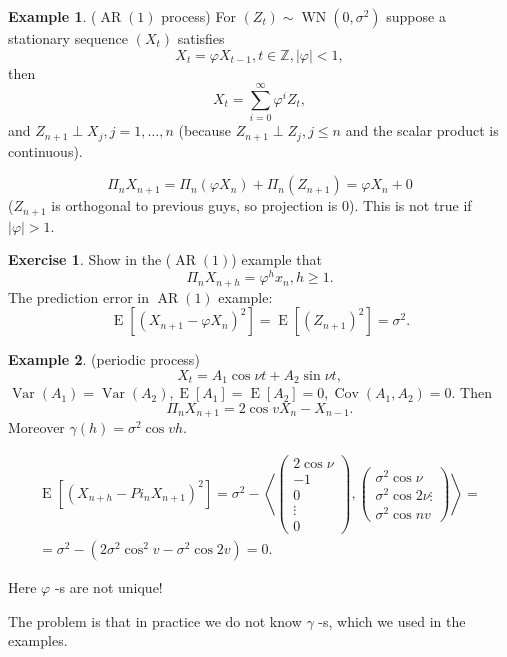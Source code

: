 \documentclass[12pt,a4paper, notitlepage]{book}
\theoremstyle{definition} %
\newtheorem{example}{Example}[chapter]
\newtheorem{exercise}{Exercise}[chapter]
\theoremstyle{plain} %
\newcommand{\Z}{\mathbb Z}
\DeclareMathOperator{\Var}{Var}
\DeclareMathOperator{\Cov}{Cov}
\DeclareMathOperator{\E}{E}
\DeclareMathOperator{\Wn}{WN}
\DeclareMathOperator{\Ar}{AR}
\begin{document}
\begin{example} ($\Ar(1)$ process)
For $(Z_t) \sim \Wn(0, \sigma^2)$ suppose a stationary sequence $(X_t)$ satisfies
\[ X_t = \varphi X_{t-1}, t\in \Z, |\varphi| < 1, \]  then
\[ X_t = \sum_{i = 0}^\infty \varphi^i Z_t , \]  and
$Z_{n+1} \perp X_j, j=1,\dots,n$ (because $Z_{n+1} \perp Z_j, j\leq n$ and the scalar product is continuous).

\[ \Pi_n X_{n+1} = \Pi_n(\varphi X_n) + \Pi_n(Z_{n+1}) = \varphi X_n + 0 \]
 ($Z_{n+1}$ is orthogonal to previous guys, so projection is $0$). This is not true if $|\varphi| > 1$.

\end{example}

\begin{exercise}
Show in the ($\Ar(1)$) example that 
\[ \Pi_n X_{n+h} = \varphi^h x_n, h \geq 1. \]
 The prediction error in $\Ar(1)$ example:
\[ \E \left[ (X_{n+1} - \varphi X_n)^2 \right] = \E \left[ (Z_{n+1})^2 \right] = \sigma ^2 . \]
\end{exercise}

\begin{example} (periodic process)
\[ X_t = A_1 \cos{\nu t} + A_2 \sin{\nu t}, \] 
 $  \Var( A_1) = \Var (A_2) , \E[A_1] =  \E[A_2] = 0, \Cov(A_1, A_2) = 0$.
Then 
\[ \Pi_n X_{n+1} = 2 \cos{v} X_n - X_{n-1} . \]
 Moreover 
$ \gamma(h)  = \sigma^2 \cos{vh}$.  

\begin{align*}
 \E\left[(X_{n+h} - Pi_nX_{n+1})^2\right] = \sigma^2 - \left<\left( \begin{array}{c} 2 \cos{\nu} \\ -1 \\ 0 \\ \vdots \\ 0 \end{array} \right), \left( \begin{array} {c} \sigma^2\cos{\nu} \\ \sigma^2 \cos{2\nu} \vdots \\ \sigma^2 \cos{n v} \end{array} \right) \right> = \\
= \sigma^2 - (2 \sigma^2 \cos^2{v} - \sigma^2 \cos{2v}) = 0 . \end{align*}

Here $\varphi$ -s are not unique! 
\end{example}

The problem is that in practice we do not know $\gamma$ -s, which we used in the examples.
\end{document}
